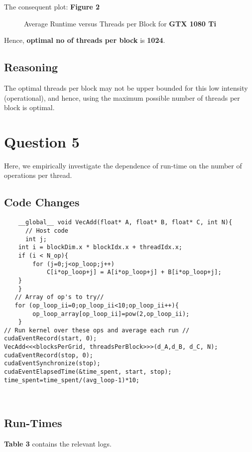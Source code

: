 The consequent plot: \textbf{Figure 2}

\begin{figure}[ht]
\centering
\caption{Average Runtime versus Threads per Block for \textbf{GTX 1080 Ti}}
\end{figure}

Hence, \textbf{optimal no of threads per block} is \textbf{1024}.\\

\subsection{Reasoning}

The optimal threads per block may not be upper bounded for this low intensity (operational), and hence, using the maximum possible number of threads per block is optimal.
\section {Question 5}

Here, we empirically investigate the dependence of run-time on the number of operations per thread.

\subsection{Code Changes} 
\begin{lstlisting}
	__global__ void VecAdd(float* A, float* B, float* C, int N){
      // Host code
      int j;
    int i = blockDim.x * blockIdx.x + threadIdx.x;
    if (i < N_op){
        for (j=0;j<op_loop;j++)
            C[i*op_loop+j] = A[i*op_loop+j] + B[i*op_loop+j];
    }
    }
   // Array of op's to try//
   for (op_loop_ii=0;op_loop_ii<10;op_loop_ii++){
        op_loop_array[op_loop_ii]=pow(2,op_loop_ii);
    }
// Run kernel over these ops and average each run //
cudaEventRecord(start, 0);
VecAdd<<<blocksPerGrid, threadsPerBlock>>>(d_A,d_B, d_C, N);
cudaEventRecord(stop, 0);
cudaEventSynchronize(stop);
cudaEventElapsedTime(&time_spent, start, stop);
time_spent=time_spent/(avg_loop-1)*10;
\end{lstlisting} \\

\subsection{Run-Times}

\textbf{Table 3} contains the relevant logs.

